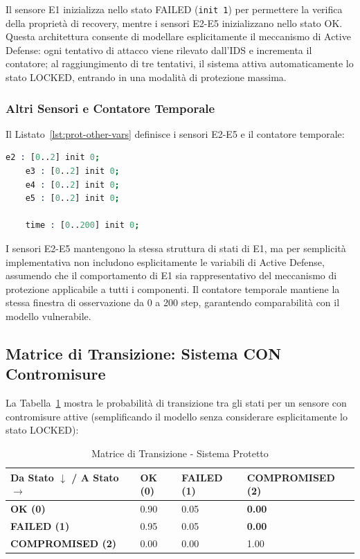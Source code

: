 Il sensore E1 inizializza nello stato FAILED (\texttt{init 1}) per permettere la verifica della proprietà di recovery, mentre i sensori E2-E5 inizializzano nello stato OK. Questa architettura consente di modellare esplicitamente il meccanismo di Active Defense: ogni tentativo di attacco viene rilevato dall'IDS e incrementa il contatore; al raggiungimento di tre tentativi, il sistema attiva automaticamente lo stato LOCKED, entrando in una modalità di protezione massima.

\subsubsection{Altri Sensori e Contatore Temporale}
Il Listato~\ref{lst:prot-other-vars} definisce i sensori E2-E5 e il contatore temporale:
\begin{lstlisting}[style=mystyle, language=Prolog, caption={Sensori E2-E5 e contatore temporale}, label=lst:prot-other-vars]
    e2 : [0..2] init 0;
    e3 : [0..2] init 0;
    e4 : [0..2] init 0;
    e5 : [0..2] init 0;
    
    time : [0..200] init 0;
\end{lstlisting}
I sensori E2-E5 mantengono la stessa struttura di stati di E1, ma per semplicità implementativa non includono esplicitamente le variabili di Active Defense, assumendo che il comportamento di E1 sia rappresentativo del meccanismo di protezione applicabile a tutti i componenti. Il contatore temporale mantiene la stessa finestra di osservazione da 0 a 200 step, garantendo comparabilità con il modello vulnerabile.

\subsection{Matrice di Transizione: Sistema CON Contromisure}
La Tabella~\ref{tab:matrice-protetto} mostra le probabilità di transizione tra gli stati per un sensore con contromisure attive (semplificando il modello senza considerare esplicitamente lo stato LOCKED):

\begin{table}[H]
\centering
\label{tab:matrice-protetto}
\begin{tabularx}{\textwidth}{|l|X|X|X|}
\hline
\textbf{Da Stato $\downarrow$ / A Stato $\rightarrow$} & \textbf{OK (0)} & \textbf{FAILED (1)} & \textbf{COMPROMISED (2)} \\ \hline
\textbf{OK (0)} & 0.90 & 0.05 & \textbf{0.00} \\ \hline
\textbf{FAILED (1)} & 0.95 & 0.05 & \textbf{0.00} \\ \hline
\textbf{COMPROMISED (2)} & 0.00 & 0.00 & 1.00 \\ \hline
\end{tabularx}
\caption{Matrice di Transizione - Sistema Protetto}
\end{table}

